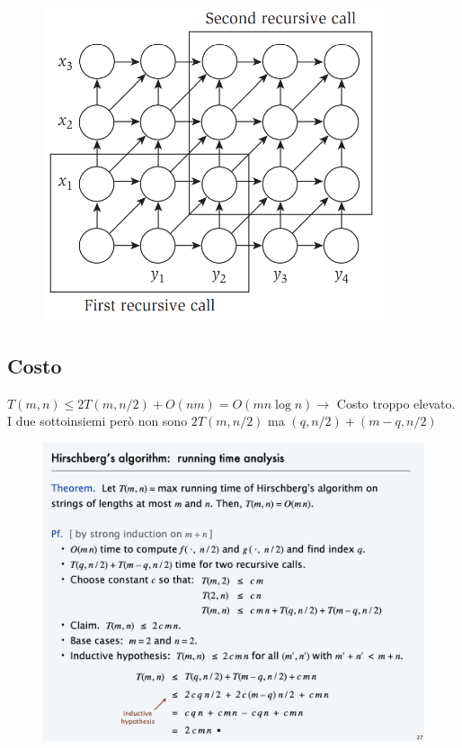 \begin{figure}[H]
  \centering
  \includegraphics[width=10cm, keepaspectratio]{capitoli/programmazione_dinamica/imgs/seq_align_recurrence.png}
\end{figure}

\subsection{Costo}

$T(m,n) \le 2T(m, n/2) + O(nm) = O(mn \log n) \rightarrow$ Costo
troppo elevato.\\ I due sottoinsiemi però non sono $2T(m, n/2)$ ma
$(q, n/2) + (m-q, n/2)$

\begin{figure}[H]
  \centering
  \includegraphics[width=12cm, keepaspectratio]{capitoli/programmazione_dinamica/imgs/hirschberg.png}
\end{figure}

